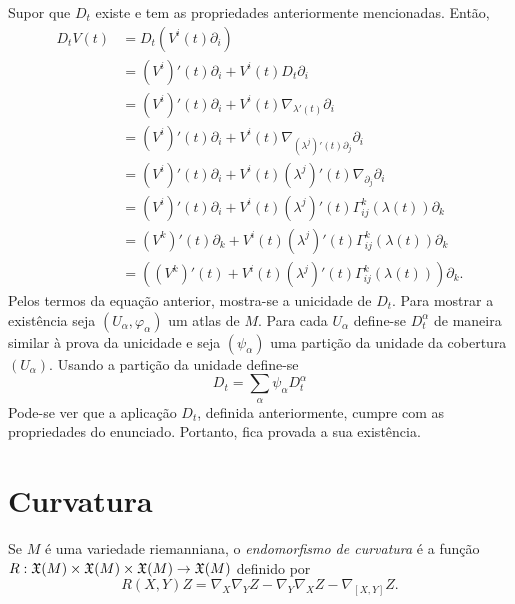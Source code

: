 \begin{demonstracao}
	Supor que $D_t$ existe e tem as propriedades anteriormente mencionadas.
	Então,
	\begin{align*}
		D_t V(t) &= D_t \left(V^i(t) \partial_i\right)\\
		&= (V^i)'(t) \partial_i + V^i(t) D_t \partial_i\\
		&= (V^i)'(t) \partial_i + V^i(t) \nabla_{\lambda'(t)} \partial_i\\
		&= (V^i)'(t) \partial_i + V^i(t) \nabla_{(\lambda^j)'(t) \partial_j} \partial_i\\
		&= (V^i)'(t) \partial_i + V^i(t) (\lambda^j)'(t)  \nabla_{\partial_j} \partial_i\\
		&= (V^i)'(t) \partial_i + V^i(t) (\lambda^j)'(t) \Gamma_{ij}^k(\lambda(t)) \partial_k\\
		&= (V^k)'(t) \partial_k + V^i(t) (\lambda^j)'(t) \Gamma_{ij}^k(\lambda(t)) \partial_k\\
		&= \left((V^k)'(t)  + V^i(t) (\lambda^j)'(t) \Gamma_{ij}^k(\lambda(t))\right) \partial_k.
	\end{align*}
	Pelos termos da equação anterior, mostra-se a unicidade de $D_t$.
	Para mostrar a existência
	seja $(U_{\alpha}, \varphi_{\alpha})$ um atlas de $M$.
	Para cada $U_{\alpha}$ define-se $D_t^{\alpha}$ de maneira similar à prova da unicidade e
	seja $(\psi_{\alpha})$ uma partição da unidade da cobertura $(U_{\alpha})$.
	Usando a partição da unidade define-se
	\begin{equation*}
		D_t = \sum_{\alpha} \psi_{\alpha} D_t^{\alpha}
	\end{equation*}
	Pode-se ver que a aplicação $D_t$, definida anteriormente, cumpre com as propriedades do enunciado.
	Portanto, fica provada a sua existência. 
\end{demonstracao}

\section{Curvatura}

\begin{definicao}
	Se $M$ é uma variedade riemanniana, o \emph{endomorfismo de curvatura} é a função $R: \mathfrak{X}(M) \times \mathfrak{X}(M) \times \mathfrak{X}(M) \rightarrow \mathfrak{X}(M) $ definido por
	\begin{equation*}
		R(X,Y)Z = \nabla_X \nabla_Y Z - \nabla_Y \nabla_X Z - \nabla_{[X,Y]}Z.
	\end{equation*}
\end{definicao}


